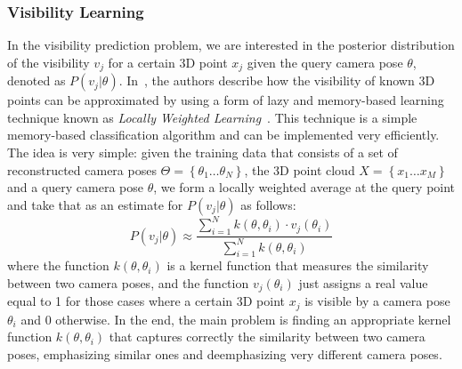\subsubsection{Visibility Learning}\label{sec:visibility}
In the visibility prediction problem, we are interested in the posterior distribution of the visibility $v_{j}$ for a certain 3D point $x_{j}$ given the query camera pose $\theta$, denoted as $P(v_{j} \vert \theta)$. In~\cite{Alcantarilla11icra}, the authors describe how the visibility of known 3D points can be approximated by using a form of lazy and memory-based learning technique known as \textit{Locally Weighted Learning}~\cite{Atkeson97ai}. This technique is a simple memory-based classification algorithm and can be implemented very efficiently. The idea is very simple: given the training data that
consists of a set of reconstructed camera poses $\Theta = \left\{\theta_1 \ldots \theta_N \right\}$, the 3D point cloud $X = \left\{x_1 \ldots x_M\right\}$ and a query camera pose $\theta$, we
form a locally weighted average at the query point and take that as an estimate for $P(v_{j} \vert \theta)$ as follows:
%
\begin{equation} \label{eq:locally_weighted}
 P(v_j \vert \theta) \approx \frac{\sum\limits_{i=1}^{N} k(\theta,\theta_{i})\cdot v_j(\theta_i)}{\sum\limits_{i=1}^{N} k(\theta,\theta_{i})}
\end{equation}
% 
where the function $k(\theta,\theta_{i})$ is a kernel function that measures the similarity between two camera poses, and the function $v_{j}(\theta_i)$ just assigns a real value equal to 1 for those cases
where a certain 3D point $x_{j}$ is visible by a camera pose $\theta_{i}$ and 0 otherwise. In the end, the main problem is finding an appropriate kernel function $k(\theta,\theta_{i})$ that captures correctly the similarity between two camera poses, emphasizing similar ones and deemphasizing very different camera poses.

